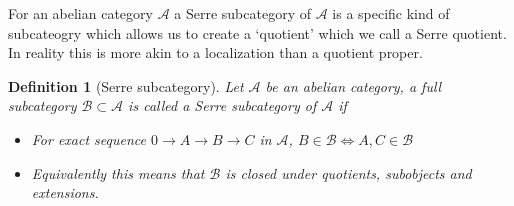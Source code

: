 \documentclass[12pt]{report}
\numberwithin{equation}{section}
\newtheorem{definition}[dummy]{Definition}
\newtheorem{example}[dummy]{Example}
\begin{document}
	For an abelian category $\mathcal{A}$ a Serre subcategory of $\mathcal{A}$ is a specific kind of subcateogry which allows us to create a `quotient' which we call a Serre quotient. In reality this is more akin to a localization than a quotient proper. 
	
	\begin{definition}[Serre subcategory]
		Let $\mathcal{A}$ be an abelian category, a full subcategory $\mathcal{B} \subset \mathcal{A}$ is called a Serre subcategory of $\mathcal{A}$ if \begin{itemize}
			\item For exact sequence $0 \to A \to B \to C $ in $\mathcal{A}$, $B \in \mathcal{B} \iff A,C \in \mathcal{B}$
			\item Equivalently this means that $\mathcal{B}$ is closed under quotients, subobjects and extensions.
		\end{itemize}
	\end{definition}
	
\end{document}
